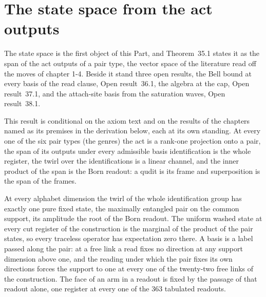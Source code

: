 \section{The state space from the act outputs}\label{mod:II-1-state-space-from-the-act-outputs}
\label{narr:open:2-1}The state space is the first object of this Part, and Theorem~35.1 states it as the span of the act outputs of a pair type, the vector space of the literature read off the moves of chapter 1-4. Beside it stand three open results, the Bell bound at every basis of the read clause, Open result~36.1, the algebra at the cap, Open result~37.1, and the attach-site basis from the saturation waves, Open result~38.1.
\begin{chconditional}\label{box:II-1-state-space-from-the-act-outputs:1}
This result is conditional on the axiom text and on the results of the chapters named as its premises in the derivation below, each at its own standing.
At every one of the six pair types (the genres) the act is a rank-one projection onto a pair, the span of its outputs under every admissible basis identification is the whole register, the twirl over the identifications is a linear channel, and the inner product of the span is the Born readout: a qudit is its frame and superposition is the span of the frames.
\end{chconditional}
At every alphabet dimension the twirl of the whole identification group has exactly one pure fixed state, the maximally entangled pair on the common support, its amplitude the root of the Born readout.
The uniform washed state at every cut register of the construction is the marginal of the product of the pair states, so every traceless operator has expectation zero there.
A basis is a label passed along the pair: at a free link a read fixes no direction at any support dimension above one, and the reading under which the pair fixes its own directions forces the support to one at every one of the twenty-two free links of the construction.
The face of an arm in a readout is fixed by the passage of that readout alone, one register at every one of the 363 tabulated readouts.
